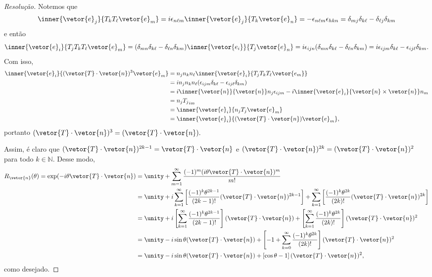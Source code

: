 \begin{proof}[Resolução]
   Notemos que 
   \begin{equation*}
      \inner{\vetor{e}_j}{T_k T_{\ell} \vetor{e}_m} = i \epsilon_{n \ell m}\inner{\vetor{e}_j}{T_k \vetor{e}_n} = - \epsilon_{n \ell m} \epsilon_{h k n} = \delta_{mj} \delta_{k\ell} - \delta_{\ell j} \delta_{km}
   \end{equation*}
   e então
   \begin{equation*}
      \inner{\vetor{e}_i}{T_j T_k T_{\ell} \vetor{e}_m} = (\delta_{mn} \delta_{k\ell} - \delta_{\ell n} \delta_{km}) \inner{\vetor{e_i}}{T_j \vetor{e}_n} = i\epsilon_{i j n}(\delta_{mn} \delta_{k\ell} - \delta_{\ell n} \delta_{km}) = i\epsilon_{ijm} \delta_{k\ell} - \epsilon_{ij \ell} \delta_{km}.
   \end{equation*}
   Com isso,
   \begin{align*}
      \inner{\vetor{e}_i}{(\vetor{T} \cdot \vetor{n})^3\vetor{e}_m} 
      &= n_j n_k n_\ell \inner{\vetor{e}_i}{T_j T_k T_\ell \vetor{e_m}}\\
      &= in_j n_k n_\ell (\epsilon_{ijm} \delta_{k\ell} - \epsilon_{ij\ell} \delta_{km})\\
      &= i\inner{\vetor{n}}{\vetor{n}} n_j \epsilon_{ijm} - i\inner{\vetor{e}_i}{\vetor{n}\times \vetor{n}} n_m\\
      &=  n_j {T_j}_{im}\\
      &= \inner{\vetor{e}_i}{n_jT_j \vetor{e}_m}\\
      &= \inner{\vetor{e}_i}{(\vetor{T} \cdot \vetor{n})\vetor{e}_m},
   \end{align*}
   portanto \((\vetor{T} \cdot \vetor{n})^3 = (\vetor{T} \cdot \vetor{n}).\) 

   Assim, é claro que \((\vetor{T} \cdot \vetor{n})^{2k - 1} = \vetor{T} \cdot \vetor{n}\) e \((\vetor{T} \cdot \vetor{n})^{2k} = (\vetor{T} \cdot \vetor{n})^2\) para todo \(k \in \mathbb{N}.\) Desse modo,
   \begin{align*}
      R_{\vetor{n}}(\theta) = \exp( - i\theta \vetor{T} \cdot \vetor{n}) 
      &= \unity + \sum_{m = 1}^\infty \frac{(-1)^m (i \theta \vetor{T} \cdot \vetor{n})^m}{m!}\\
      &= \unity + i\sum_{k = 1}^\infty\left[\frac{(-1)^k \theta^{2k - 1}}{(2k - 1)!} (\vetor{T} \cdot \vetor{n})^{2k - 1}\right] + \sum_{k = 1}^\infty\left[\frac{(-1)^k \theta^{2k}}{(2k)!} (\vetor{T} \cdot \vetor{n})^{2k}\right]\\
      &= \unity + i\left[\sum_{k = 1}^\infty\frac{(-1)^k \theta^{2k - 1}}{(2k - 1)!} \right](\vetor{T} \cdot \vetor{n}) + \left[\sum_{k = 1}^\infty\frac{(-1)^k \theta^{2k}}{(2k)!} \right](\vetor{T} \cdot \vetor{n})^{2}\\
      &= \unity - i \sin\theta (\vetor{T} \cdot \vetor{n}) + \left[-1 + \sum_{k = 0}^\infty \frac{(-1)^k\theta^{2k}}{(2k)!}\right] (\vetor{T} \cdot \vetor{n})^2\\
      &= \unity - i\sin\theta(\vetor{T} \cdot \vetor{n}) + \left[\cos\theta - 1\right] (\vetor{T}\cdot\vetor{n})^2,
   \end{align*}
   como desejado.
\end{proof}
